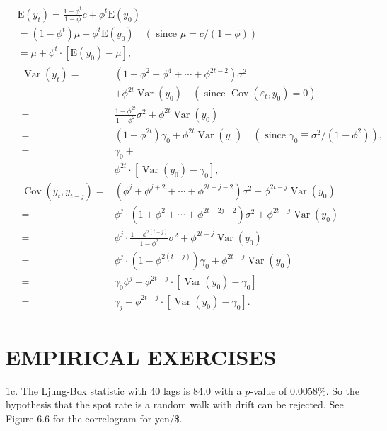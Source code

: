 \documentclass[10pt]{article}
\begin{document}
$$
\begin{aligned}
& \mathrm{E}\left(y_{t}\right)=\frac{1-\phi^{t}}{1-\phi} c+\phi^{t} \mathrm{E}\left(y_{0}\right) \\
& =\left(1-\phi^{t}\right) \mu+\phi^{t} \mathrm{E}\left(y_{0}\right) \quad(\text { since } \mu=c /(1-\phi)) \\
& =\mu+\phi^{t} \cdot\left[\mathrm{E}\left(y_{0}\right)-\mu\right], \\
& \begin{aligned}
\operatorname{Var}\left(y_{t}\right)= & \left(1+\phi^{2}+\phi^{4}+\cdots+\phi^{2 t-2}\right) \sigma^{2} \\
& +\phi^{2 t} \operatorname{Var}\left(y_{0}\right) \quad\left(\text { since } \operatorname{Cov}\left(\varepsilon_{t}, y_{0}\right)=0\right) \\
= & \frac{1-\phi^{2 t}}{1-\phi^{2}} \sigma^{2}+\phi^{2 t} \operatorname{Var}\left(y_{0}\right) \\
= & \left(1-\phi^{2 t}\right) \gamma_{0}+\phi^{2 t} \operatorname{Var}\left(y_{0}\right) \quad\left(\text { since } \gamma_{0} \equiv \sigma^{2} /\left(1-\phi^{2}\right)\right), \\
= & \gamma_{0}+ \\
& \phi^{2 t} \cdot\left[\operatorname{Var}\left(y_{0}\right)-\gamma_{0}\right], \\
\operatorname{Cov}\left(y_{t}, y_{t-j}\right)= & \left(\phi^{j}+\phi^{j+2}+\cdots+\phi^{2 t-j-2}\right) \sigma^{2}+\phi^{2 t-j} \operatorname{Var}\left(y_{0}\right) \\
= & \phi^{j} \cdot\left(1+\phi^{2}+\cdots+\phi^{2 t-2 j-2}\right) \sigma^{2}+\phi^{2 t-j} \operatorname{Var}\left(y_{0}\right) \\
= & \phi^{j} \cdot \frac{1-\phi^{2(t-j)}}{1-\phi^{2}} \sigma^{2}+\phi^{2 t-j} \operatorname{Var}\left(y_{0}\right) \\
= & \phi^{j} \cdot\left(1-\phi^{2(t-j)}\right) \gamma_{0}+\phi^{2 t-j} \operatorname{Var}\left(y_{0}\right) \\
= & \gamma_{0} \phi^{j}+\phi^{2 t-j} \cdot\left[\operatorname{Var}\left(y_{0}\right)-\gamma_{0}\right] \\
= & \gamma_{j}+\phi^{2 t-j} \cdot\left[\operatorname{Var}\left(y_{0}\right)-\gamma_{0}\right] .
\end{aligned}
\end{aligned}
$$

\section*{EMPIRICAL EXERCISES}
1c. The Ljung-Box statistic with 40 lags is 84.0 with a $p$-value of $0.0058 \%$. So the hypothesis that the spot rate is a random walk with drift can be rejected. See Figure 6.6 for the correlogram for yen/\$.
\end{document}
